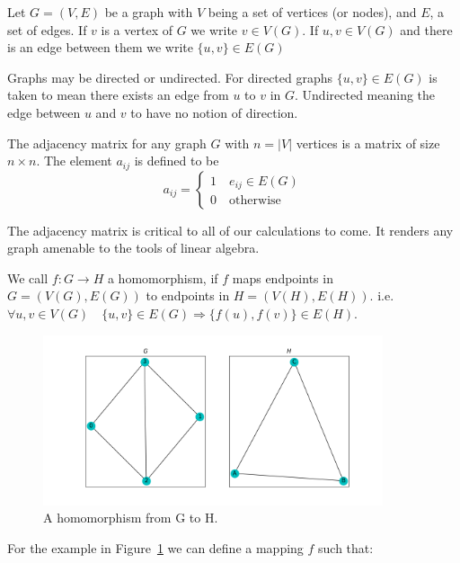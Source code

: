 \begin{dfn}
    Let $G = (V,E)$ be a graph with $V$ being a set of vertices (or nodes), 
and $E$, a set of edges. If $v$ is a vertex of $G$ we write $v \in V(G)$. 
If $u,v \in V(G)$ and there is an edge between them we 
write $\{u,v\} \in E(G)$
\end{dfn}

Graphs may be directed or undirected. For directed graphs $\{u,v\} \in E(G)$
is taken to mean there exists an edge from $u$ to $v$ in $G$. Undirected meaning the 
edge between $u$ and $v$ to have no notion of direction.

\begin{dfn}
    The adjacency matrix for any graph $G$ with $n=|V|$ vertices is a matrix of size
    $n \times n$. The element $a_{ij}$ is defined to be
    $$
    a_{ij} = 
    \begin{cases}
        1 \quad e_{ij} \in E(G)\\
        0 \quad \text{otherwise}
    \end{cases}
    $$
    \label{def:adjmat}
\end{dfn}

\noindent The adjacency matrix is critical to all of our calculations to come. It renders
any graph amenable to the tools of linear algebra.

\begin{dfn}
\label{def:homomorphism}
We call $f: G \rightarrow H$ a homomorphism,
if $f$ maps endpoints in $G=(V(G),E(G))$ to endpoints in $H=(V(H),E(H))$.
i.e. $ \forall u,v \in V(G) \quad \{u,v\} \in E(G) \Rightarrow \{f(u),
f(v)\} \in E(H)$.
\end{dfn}

\begin{figure}[h!]
    \includegraphics[width=10cm]{Images/graph_homomorphism.png}
    \centering
    \caption{A homomorphism from G to H.}
    \label{fig:homomorphism}
\end{figure}

\noindent  For the example in Figure~\ref{fig:homomorphism} we can define a mapping $f$ such that:

